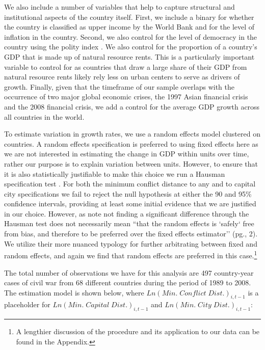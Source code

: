 We also include a number of variables that help to capture structural and institutional aspects of the country itself. First, we include a binary for whether the country is classified as upper income by the World Bank and for the level of inflation in the country. Second, we also control for the level of democracy in the country using the polity index \citep{marshall:etal:2013}. We also control for the proportion of a country's GDP that is made up of natural resource rents. This is a particularly important variable to control for as countries that draw a large share of their GDP from natural resource rents likely rely less on urban centers to serve as drivers of growth. Finally, given that the timeframe of our sample overlaps with the occurrence of two major global economic crises, the 1997 Asian financial crisis and the 2008 financial crisis, we add a control for the average GDP growth across all countries in the world. 

To estimate variation in growth rates, we use a random effects model clustered on countries. A random effects specification is preferred to using fixed effects here as we are not interested in estimating the change in GDP within units over time, rather our purpose is to explain variation between units. However, to ensure that it is also statistically justifiable to make this choice we run a Hausman specification test \citep{greene:2008}. For both the minimum conflict distance to any and to capital city specifications we fail to reject the null hypothesis at either the 90 and 95\% confidence intervals, providing at least some initial evidence that we are justified in our choice. However, as \citet{clark:linzer:2015} note not finding a significant difference through the Hausman test does not necessarily mean ``that the random effects is `safely` free from bias, and therefore to be preferred over the fixed effects estimator'' (pg., 2). We utilize their more nuanced typology for further arbitrating between fixed and random effects, and again we find that random effects are preferred in this case.\footnote{A lengthier discussion of the \citet{clark:linzer:2015} procedure and its application to our data can be found in the Appendix.}

The total number of observations we have for this analysis are 497 country-year cases of civil war from 68 different countries during the period of 1989 to 2008. The estimation model is shown below, where $Ln(Min. \; Conflict \; Dist.)_{i,t-1}$ is a placeholder for $Ln(Min. \; Capital \; Dist.)_{i,t-1}$ and $Ln(Min. \; City \; Dist.)_{i,t-1}$:

